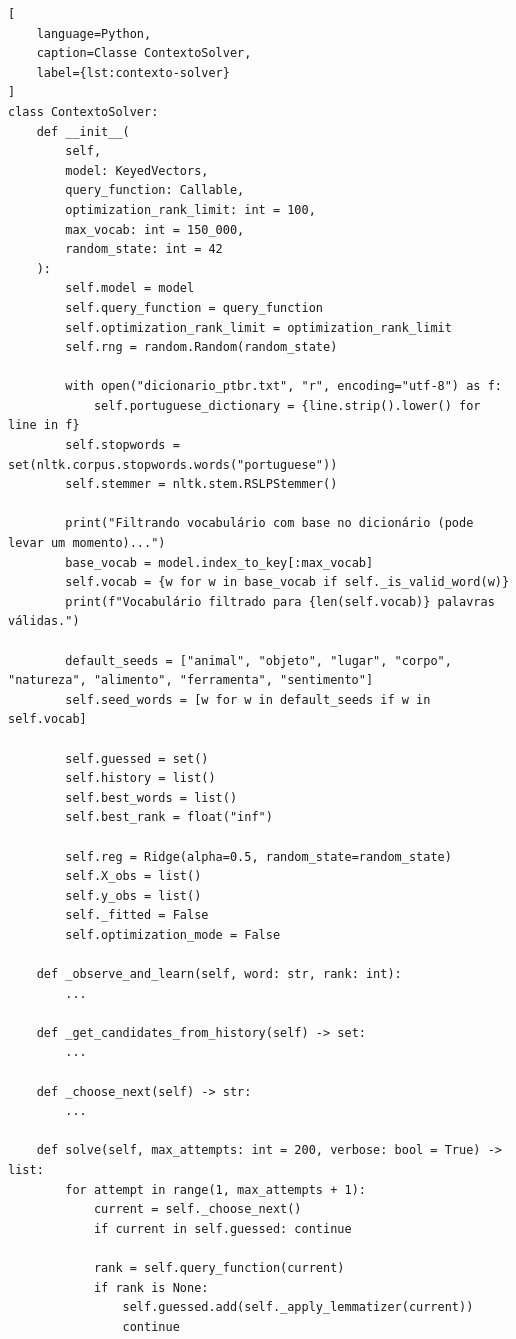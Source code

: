 \begin{lstlisting}[
    language=Python,
    caption=Classe ContextoSolver,
    label={lst:contexto-solver}
]
class ContextoSolver:
    def __init__(
        self,
        model: KeyedVectors,
        query_function: Callable,
        optimization_rank_limit: int = 100,
        max_vocab: int = 150_000,
        random_state: int = 42
    ):
        self.model = model
        self.query_function = query_function
        self.optimization_rank_limit = optimization_rank_limit
        self.rng = random.Random(random_state)
        
        with open("dicionario_ptbr.txt", "r", encoding="utf-8") as f:
            self.portuguese_dictionary = {line.strip().lower() for line in f}
        self.stopwords = set(nltk.corpus.stopwords.words("portuguese"))
        self.stemmer = nltk.stem.RSLPStemmer()

        print("Filtrando vocabulário com base no dicionário (pode levar um momento)...")
        base_vocab = model.index_to_key[:max_vocab]
        self.vocab = {w for w in base_vocab if self._is_valid_word(w)}
        print(f"Vocabulário filtrado para {len(self.vocab)} palavras válidas.")

        default_seeds = ["animal", "objeto", "lugar", "corpo", "natureza", "alimento", "ferramenta", "sentimento"]
        self.seed_words = [w for w in default_seeds if w in self.vocab]

        self.guessed = set()
        self.history = list()
        self.best_words = list()
        self.best_rank = float("inf")

        self.reg = Ridge(alpha=0.5, random_state=random_state)
        self.X_obs = list()
        self.y_obs = list()
        self._fitted = False 
        self.optimization_mode = False

    def _observe_and_learn(self, word: str, rank: int):
        ...

    def _get_candidates_from_history(self) -> set:
        ...

    def _choose_next(self) -> str:
        ...

    def solve(self, max_attempts: int = 200, verbose: bool = True) -> list:
        for attempt in range(1, max_attempts + 1):
            current = self._choose_next()
            if current in self.guessed: continue

            rank = self.query_function(current)
            if rank is None:
                self.guessed.add(self._apply_lemmatizer(current))
                continue
            

\end{lstlisting}

